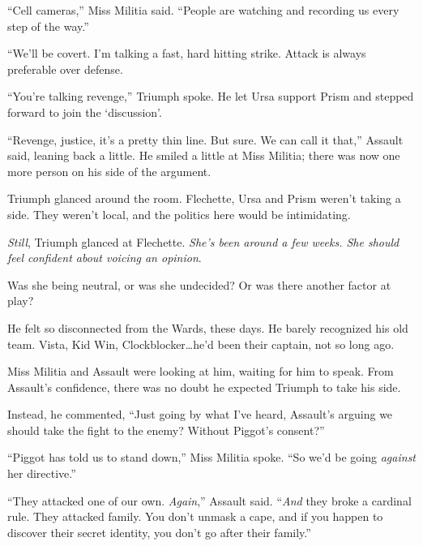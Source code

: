 ``Cell cameras,''  Miss Militia said.  ``People are watching and recording us every step of the way.''



``We'll be covert.  I'm talking a fast, hard hitting strike.  Attack is always preferable over defense.



``You're talking revenge,'' Triumph spoke.  He let Ursa support Prism and stepped forward to join the `discussion'.



``Revenge, justice, it's a pretty thin line.  But sure.  We can call it that,'' Assault said, leaning back a little.  He smiled a little at Miss Militia; there was now one more person on his side of the argument.



Triumph glanced around the room.  Flechette, Ursa and Prism weren't taking a side.  They weren't local, and the politics here would be intimidating.



\emph{Still}, Triumph glanced at Flechette.  \emph{She's been around a few weeks.  She should feel confident about voicing an opinion}.



Was she being neutral, or was she undecided?  Or was there another factor at play?



He felt so disconnected from the Wards, these days.  He barely recognized his old team.  Vista, Kid Win, Clockblocker\ldots he'd been their captain, not so long ago.



Miss Militia and Assault were looking at him, waiting for him to speak.  From Assault's confidence, there was no doubt he expected Triumph to take his side.



Instead, he commented, ``Just going by what I've heard, Assault's arguing we should take the fight to the enemy?  Without Piggot's consent?''



``Piggot has told us to stand down,'' Miss Militia spoke.  ``So we'd be going \emph{against} her directive.''



``They attacked one of our own.  \emph{Again},'' Assault said.  ``\emph{And} they broke a cardinal rule.  They attacked family.  You don't unmask a cape, and if you happen to discover their secret identity, you don't go after their family.''



